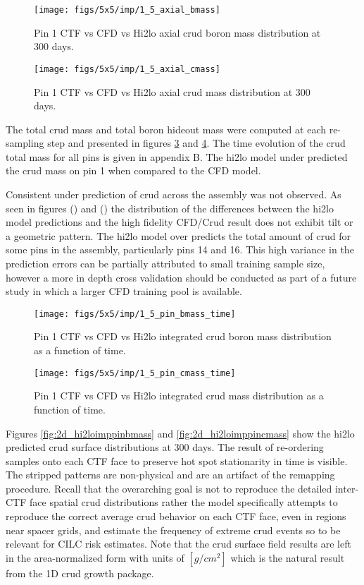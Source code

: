 \begin{figure}[H]
    \centering
    \texttt{[image: figs/5x5/imp/1\_5\_axial\_bmass]}
    \caption{Pin 1 CTF vs CFD vs Hi2lo axial crud boron mass distribution at 300 days.}
    \label{fig:15axialbmass}
\end{figure}
\begin{figure}[H]
    \centering
    \texttt{[image: figs/5x5/imp/1\_5\_axial\_cmass]}
    \caption{Pin 1 CTF vs CFD vs Hi2lo axial crud mass distribution at 300 days.}
    \label{fig:15axialcmass}
\end{figure}

The total crud mass and total boron hideout mass were computed at each re-sampling step and presented in figures \ref{fig:15pinbmasstime} and \ref{fig:15pincmasstime}.  The time evolution of the crud total mass for all pins is given in appendix B.  The hi2lo model under predicted the crud mass on pin 1 when compared to the CFD model.

Consistent under prediction of crud across the assembly was not observed. As seen in figures () and () the distribution of the differences between the hi2lo model predictions and the high fidelity CFD/Crud result does not exhibit tilt or a geometric pattern.  The hi2lo model over predicts the total amount of crud for some pins in the assembly, particularly pins 14 and 16.  This high variance in the prediction errors can be partially attributed to small training sample size, however a more in depth cross validation should be conducted as part of a future study in which a larger CFD training pool is available.  

\begin{figure}[H]
    \centering
    \texttt{[image: figs/5x5/imp/1\_5\_pin\_bmass\_time]}
    \caption{Pin 1 CTF vs CFD vs Hi2lo integrated crud boron mass distribution as a function of time.}
    \label{fig:15pinbmasstime}
\end{figure}
\begin{figure}[H]
    \centering
    \texttt{[image: figs/5x5/imp/1\_5\_pin\_cmass\_time]}
    \caption{Pin 1 CTF vs CFD vs Hi2lo integrated crud mass distribution as a function of time.}
    \label{fig:15pincmasstime}
\end{figure}

Figures \ref{fig:2d_hi2loimppinbmass} and \ref{fig:2d_hi2loimppincmass} show the hi2lo predicted crud surface distributions at 300 days.  The result of re-ordering samples onto each CTF face to preserve hot spot stationarity in time is visible.  The stripped patterns are non-physical and are an artifact of the remapping procedure.  Recall that the overarching goal is not to reproduce the detailed inter-CTF face spatial crud distributions rather the model specifically attempts to reproduce the correct average crud behavior on each CTF face, even in regions near spacer grids, and estimate the frequency of extreme crud events so to be relevant for CILC risk estimates.
Note that the crud surface field results are left in the area-normalized form with units of $[g/cm^2]$ which is the natural result from the 1D crud growth package.

